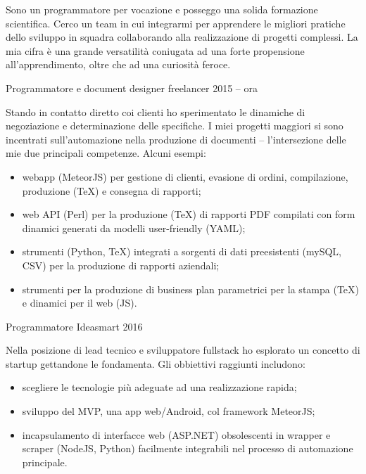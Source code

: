 \documentclass[9pt]{scrartcl}
\begin{document}

Sono un programmatore per vocazione e posseggo una solida formazione scientifica.
Cerco un team in cui integrarmi per apprendere le migliori pratiche dello sviluppo
in squadra collaborando alla realizzazione di progetti complessi.
La mia cifra è una grande versatilità coniugata ad una forte propensione
all'apprendimento, oltre che ad una curiosità feroce.


\Event
  {Programmatore e document designer}
  {freelancer}
  {2015 -- ora}

Stando in contatto diretto coi clienti ho sperimentato le dinamiche di
negoziazione e determinazione delle specifiche. I miei progetti maggiori
si sono incentrati sull'automazione nella produzione di documenti --
l'intersezione delle mie due principali competenze. Alcuni esempi:

\begin{itemize}[twocol]
  \item webapp (MeteorJS) per gestione di clienti, evasione di ordini,
  compilazione, produzione (\TeX) e consegna di rapporti;
  \item web API (Perl) per la produzione (\TeX) di rapporti PDF compilati
  con form dinamici generati da modelli user-friendly (YAML);
  \item strumenti (Python, \TeX) integrati a sorgenti di dati preesistenti
  (mySQL, CSV) per la produzione di rapporti aziendali;
  \item strumenti per la produzione di business plan parametrici per la
  stampa (\TeX) e dinamici per il web (JS).
\end{itemize}

\Event
  {Programmatore}
  {Ideasmart}
  {2016}

Nella posizione di lead tecnico e sviluppatore fullstack ho esplorato un
concetto di startup gettandone le fondamenta. Gli obbiettivi raggiunti
includono:

\begin{itemize}
  \item scegliere le tecnologie più adeguate ad una realizzazione rapida;
  \item sviluppo del MVP, una app web/Android, col framework MeteorJS;
  \item incapsulamento di interfacce web (ASP.NET) obsolescenti in
  wrapper e scraper (NodeJS, Python) facilmente integrabili nel processo
  di automazione principale.
\end{itemize}
\end{document}
